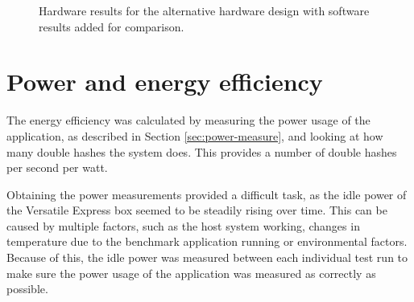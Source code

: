 \begin{figure}
	\centering
	\caption{Hardware results for the alternative hardware design with software results added for comparison.}
	\label{fig:shadmacomp-scaling2}
\end{figure}

\section{Power and energy efficiency}

The energy efficiency was calculated by measuring the power usage of the application, as described in Section \ref{sec:power-measure},
and looking at how many double hashes the system does. This provides a number of double hashes per second per watt.

Obtaining the power measurements provided a difficult task, as the idle power of the Versatile Express box seemed to be
steadily rising over time. This can be caused by multiple factors, such as the host system working, changes in temperature
due to the benchmark application running or environmental factors. Because of this, the idle power was measured between
each individual test run to make sure the power usage of the application was measured as correctly as possible.

